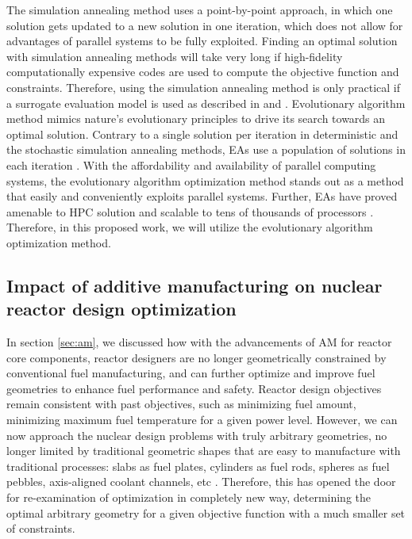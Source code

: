 The simulation annealing method uses a point-by-point approach, in which one
solution gets updated to a new solution in one iteration, which does not 
allow for advantages of parallel systems to be fully exploited. 
Finding an optimal solution with simulation annealing methods will take very 
long if high-fidelity computationally expensive codes are used to compute 
the objective function and constraints.
Therefore, using the simulation annealing method is only practical if a 
surrogate evaluation model is used as described in \cite{betzler_design_2019}
and \cite{kumar_new_2015}.
Evolutionary algorithm method mimics nature's evolutionary principles to drive 
its search towards an optimal solution. 
Contrary to a single solution per iteration in deterministic and the stochastic 
simulation annealing methods, \glspl{EA} use a population of solutions in each 
iteration \cite{deb_multi-objective_2001}. 
With the affordability and availability of parallel computing systems, the 
evolutionary algorithm optimization method stands out as a method 
that easily and conveniently exploits parallel systems. 
Further, \glspl{EA} have proved amenable to \gls{HPC} solution and 
scalable to tens of thousands of processors \cite{kropaczek_constraint_2019}. 
Therefore, in this proposed work, we will utilize the evolutionary algorithm 
optimization method. 

\subsection{Impact of additive manufacturing on nuclear reactor design 
optimization}
In section \ref{sec:am}, we discussed how with the advancements of \gls{AM} 
for reactor core components, reactor designers are no longer geometrically 
constrained by conventional fuel manufacturing, and can further optimize and 
improve fuel geometries to enhance fuel performance and safety. 
Reactor design objectives remain consistent with past objectives, such as minimizing 
fuel amount, minimizing maximum fuel temperature for a given power level. 
However, we can now approach the nuclear design problems with truly arbitrary 
geometries, no longer limited by traditional geometric shapes that are 
easy to manufacture with traditional processes: slabs as fuel plates, cylinders 
as fuel rods, spheres as fuel pebbles, axis-aligned coolant channels, etc  
\cite{sobes_artificial_2020}.
Therefore, this has opened the door for re-examination of optimization in 
completely new way, determining the optimal arbitrary geometry for a given objective 
function \cite{sobes_artificial_2020} with a much smaller set of constraints. 

